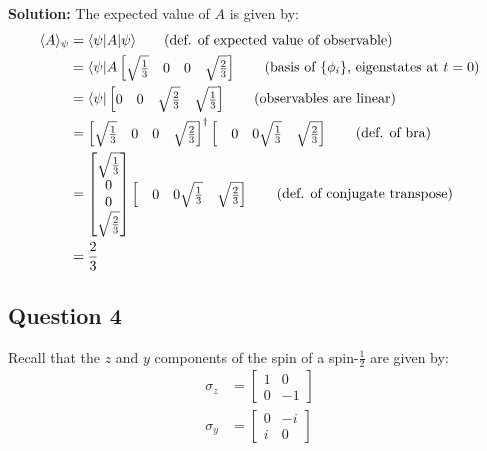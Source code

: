 \documentclass{article}
\begin{document}
\noindent\textbf{Solution:} The expected value of $A$ is given by:
\begin{align*}
    \langle A\rangle_\psi&=\langle\psi|A|\psi\rangle\tag{def. of expected value of observable}\\
    &=\langle\psi|A\begin{bmatrix}
        \sqrt{\frac{1}{3}}&0&0&\sqrt{\frac{2}{3}}
    \end{bmatrix}\tag{basis of $\{\phi_i\}$, eigenstates at $t=0$}\\
    &=\langle\psi|\begin{bmatrix}
        0&0&\sqrt{\frac{2}{3}}&\sqrt{\frac{1}{3}}
    \end{bmatrix}\tag{observables are linear}\\
    &=\begin{bmatrix}
        \sqrt{\frac{1}{3}}&0&0&\sqrt{\frac{2}{3}}
    \end{bmatrix}^\dagger\begin{bmatrix}
        &0&0\sqrt{\frac{1}{3}}&\sqrt{\frac{2}{3}}
    \end{bmatrix}\tag{def. of bra}\\
    &=\begin{bmatrix}
        \sqrt{\frac{1}{3}}\\0\\0\\\sqrt{\frac{2}{3}}
    \end{bmatrix}\begin{bmatrix}
        &0&0\sqrt{\frac{1}{3}}&\sqrt{\frac{2}{3}}
    \end{bmatrix}\tag{def. of conjugate transpose}\\
    &=\frac{2}{3}
\end{align*}
\bigskip
\newpage

\subsection*{Question 4}
Recall that the $z$ and $y$ components of the spin of a spin-$\frac{1}{2}$ are given by:
\begin{align*}
    \sigma_z&=\begin{bmatrix}
        1&0\\0&-1
    \end{bmatrix}\\
    \sigma_y&=\begin{bmatrix}
        0&-i\\i&0
    \end{bmatrix}
\end{align*}
\bigskip
\end{document}
